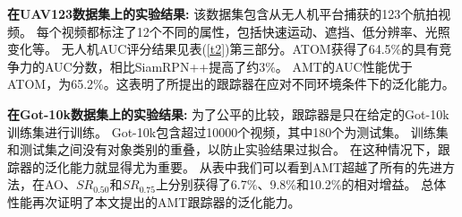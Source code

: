 \documentclass[promaster]{thesis-uestc}
\begin{document}
\textbf{在UAV123数据集上的实验结果:}
该数据集包含从无人机平台捕获的123个航拍视频。
每个视频都标注了12个不同的属性，包括快速运动、遮挡、低分辨率、光照变化等。
无人机AUC评分结果见表(\ref{t2})第三部分。ATOM获得了64.5\%的具有竞争力的AUC分数，相比SiamRPN++提高了约3\%。
AMT的AUC性能优于ATOM，为65.2\%。这表明了所提出的跟踪器在应对不同环境条件下的泛化能力。

\begin{table}[!htbp]
    \centering
    \caption{我们的方法与6个先进跟踪器在OTB100、NFS和UAV123数据集上就AUC得分指标进行比较。}
    \vspace{3mm}
    
    \label{t2}
\end{table}


\textbf{在Got-10k数据集上的实验结果:}
为了公平的比较，跟踪器是只在给定的Got-10k训练集进行训练。
Got-10k包含超过10000个视频，其中180个为测试集。
训练集和测试集之间没有对象类别的重叠，以防止实验结果过拟合。
在这种情况下，跟踪器的泛化能力就显得尤为重要。
从表中我们可以看到AMT超越了所有的先进方法，在AO、$SR_{0.50}$和$SR_{0.75}$上分别获得了6.7\%、9.8\%和10.2\%的相对增益。
总体性能再次证明了本文提出的AMT跟踪器的泛化能力。
\end{document}

